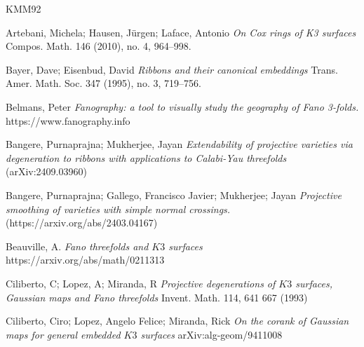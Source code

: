 \documentclass[11pt,twoside]{amsart}
\theoremstyle{plain}
\numberwithin{equation}{section}
\theoremstyle{definition}
\begin{document}
\vspace{0.5cm}


\begin{thebibliography}{KMM92}
\color{black}



Artebani, Michela; Hausen, Jürgen; Laface, Antonio
\emph{On Cox rings of K3 surfaces}
Compos. Math. 146 (2010), no. 4, 964–998.

Bayer, Dave; Eisenbud, David
\emph{Ribbons and their canonical embeddings}
Trans. Amer. Math. Soc. 347 (1995), no. 3, 719–756.

Belmans, Peter
\emph{Fanography: a tool to visually study the geography of Fano 3-folds.}
https://www.fanography.info



Bangere, Purnaprajna; Mukherjee, Jayan  
\emph{Extendability of projective varieties via degeneration to ribbons with applications to Calabi-Yau threefolds} (arXiv:2409.03960)


 Bangere, Purnaprajna; Gallego, Francisco Javier; Mukherjee; Jayan \emph{Projective smoothing of varieties with simple normal crossings.}(https://arxiv.org/abs/2403.04167)





Beauville, A. \emph{Fano threefolds and $K3$ surfaces}
https://arxiv.org/abs/math/0211313

Ciliberto, C; Lopez, A; Miranda, R
\emph{Projective degenerations of $K3$ surfaces, Gaussian maps and Fano threefolds}
Invent. Math. 114, 641 667 (1993)

Ciliberto, Ciro; Lopez, Angelo Felice; Miranda, Rick
\emph{On the corank of Gaussian maps for general embedded $K3$ surfaces}
arXiv:alg-geom/9411008


\end{thebibliography}
\end{document}
